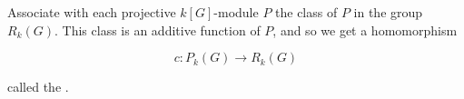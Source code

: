 Associate with each projective $k[G]$-module $P$ the class of $P$ in the group $R_k(G)$. This class is an additive function of $P$, and so we get a homomorphism

$$c: P_k(G) \rightarrow R_k(G)$$

called the .
